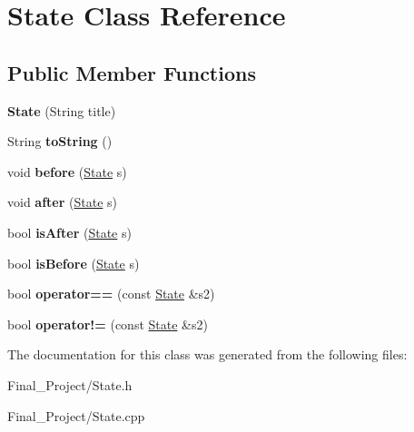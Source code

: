 \hypertarget{classState}{\section{State Class Reference}
\label{classState}
}
\subsection*{Public Member Functions}
\begin{DoxyCompactItemize}
\item 
\hypertarget{classState_a46a524e53e30ea64f5f83771b3161168}{{\bfseries State} (String title)}\label{classState_a46a524e53e30ea64f5f83771b3161168}

\item 
\hypertarget{classState_a9e8fbfe23ea36d35f4dda26b6bf74320}{String {\bfseries to\-String} ()}\label{classState_a9e8fbfe23ea36d35f4dda26b6bf74320}

\item 
\hypertarget{classState_aa0cf486ab57ee511ee3294c8cd7c7f68}{void {\bfseries before} (\hyperlink{classState}{State} s)}\label{classState_aa0cf486ab57ee511ee3294c8cd7c7f68}

\item 
\hypertarget{classState_ab9542efb84dc8f6aee27ce5bf15e289d}{void {\bfseries after} (\hyperlink{classState}{State} s)}\label{classState_ab9542efb84dc8f6aee27ce5bf15e289d}

\item 
\hypertarget{classState_a465871ca4d7c77c8758c417fc08f9448}{bool {\bfseries is\-After} (\hyperlink{classState}{State} s)}\label{classState_a465871ca4d7c77c8758c417fc08f9448}

\item 
\hypertarget{classState_a110dc5cbf3024c59347aac58c92a56d0}{bool {\bfseries is\-Before} (\hyperlink{classState}{State} s)}\label{classState_a110dc5cbf3024c59347aac58c92a56d0}

\item 
\hypertarget{classState_a68295ccd37401b56b7d6eb2939c0b218}{bool {\bfseries operator==} (const \hyperlink{classState}{State} \&s2)}\label{classState_a68295ccd37401b56b7d6eb2939c0b218}

\item 
\hypertarget{classState_ad1ab18b21263b15d69aae8cb59a06272}{bool {\bfseries operator!=} (const \hyperlink{classState}{State} \&s2)}\label{classState_ad1ab18b21263b15d69aae8cb59a06272}

\end{DoxyCompactItemize}


The documentation for this class was generated from the following files\-:\begin{DoxyCompactItemize}
\item 
Final\-\_\-\-Project/State.\-h\item 
Final\-\_\-\-Project/State.\-cpp\end{DoxyCompactItemize}
